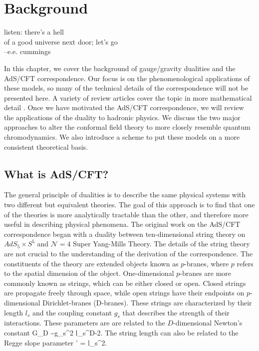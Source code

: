 \chapter{Background}
\label{background}

\begin{flushright}
 listen: there's a hell \\
of a good universe next door; let's go \\
--e.e. cummings
\end{flushright}

In this chapter, we cover the background of gauge/gravity dualities and the AdS/CFT correspondence.
Our focus is on the phenomenological applications of these models, so many of the technical details of the correspondence will not be presented here.
A variety of review articles cover the topic in more mathematical detail \cite{Ramallo2013,Zaffaroni2000,Kim2012,Erdmenger:2007cm,FILL-IN}.
Once we have motivated the AdS/CFT correspondence, we will review the applications of the duality to hadronic physics. 
We discuss the two major approaches to alter the conformal field theory to more closely resemble quantum chromodynamics.
We also introduce a scheme to put these models on a more consistent theoretical basis.

\section{What is AdS/CFT?}
The general principle of dualities is to describe the same physical systems with two different but equivalent theories. 
The goal of this approach is to find that one of the theories is more analytically tractable than the other, and therefore more useful in describing physical phenomena.
The original work on the AdS/CFT correspondence began with a duality between ten-dimensional string theory on $AdS_5 \times S^5$ and $\mathcal{N}=4 $ Super Yang-Mills Theory.
The details of the string theory are not crucial to the understanding of the derivation of the correspondence.
The constituents of the theory are extended objects known as $p$-branes, where $p$ refers to the spatial dimension of the object. 
One-dimensional $p$-branes are more commonly known as strings, which can be either closed or open.
Closed strings are propagate freely through space, while open strings have  their endpoints on $p$-dimensional Dirichlet-branes (D-branes). 
These strings are characterized by their length $l_s$ and the coupling constant $g_s$ that describes the strength of their interactions. 
These parameters are are related to the $D$-dimensional Newton's constant
\be
G_D \sim g_s^2 l_s^{D-2}.
\ee
The string length can also be related to the Regge slope parameter
\be
\alpha' = l_s^2.
\label{eq:ReggeSlope}
\ee

